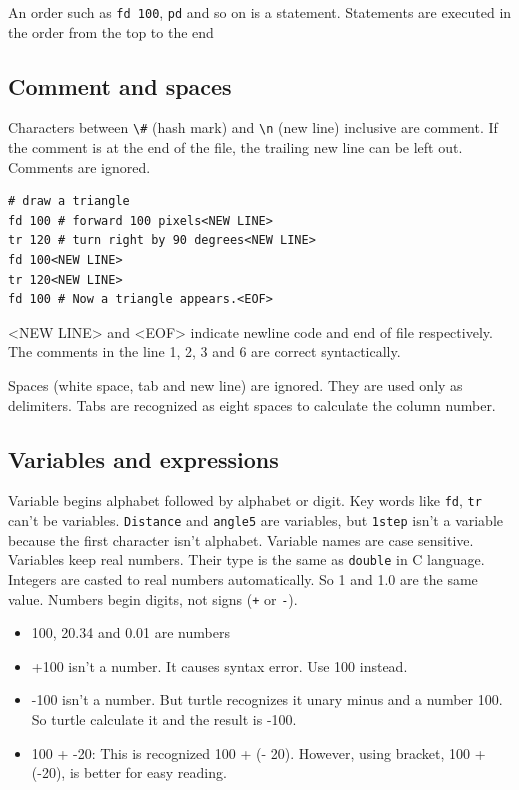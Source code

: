 An order such as \passthrough{\lstinline!fd 100!},
\passthrough{\lstinline!pd!} and so on is a statement. Statements are
executed in the order from the top to the end

\hypertarget{comment-and-spaces}{%
\subsection{Comment and spaces}\label{comment-and-spaces}}

Characters between \passthrough{\lstinline!\#!} (hash mark) and
\passthrough{\lstinline!\\n!} (new line) inclusive are comment. If the
comment is at the end of the file, the trailing new line can be left
out. Comments are ignored.

\begin{lstlisting}
# draw a triangle
fd 100 # forward 100 pixels<NEW LINE>
tr 120 # turn right by 90 degrees<NEW LINE>
fd 100<NEW LINE>
tr 120<NEW LINE>
fd 100 # Now a triangle appears.<EOF>
\end{lstlisting}

\textless NEW LINE\textgreater{} and \textless EOF\textgreater{}
indicate newline code and end of file respectively. The comments in the
line 1, 2, 3 and 6 are correct syntactically.

Spaces (white space, tab and new line) are ignored. They are used only
as delimiters. Tabs are recognized as eight spaces to calculate the
column number.

\hypertarget{variables-and-expressions}{%
\subsection{Variables and expressions}\label{variables-and-expressions}}

Variable begins alphabet followed by alphabet or digit. Key words like
\passthrough{\lstinline!fd!}, \passthrough{\lstinline!tr!} can't be
variables. \passthrough{\lstinline!Distance!} and
\passthrough{\lstinline!angle5!} are variables, but
\passthrough{\lstinline!1step!} isn't a variable because the first
character isn't alphabet. Variable names are case sensitive. Variables
keep real numbers. Their type is the same as
\passthrough{\lstinline!double!} in C language. Integers are casted to
real numbers automatically. So 1 and 1.0 are the same value. Numbers
begin digits, not signs (\passthrough{\lstinline!+!} or
\passthrough{\lstinline!-!}).

\begin{itemize}
\tightlist
\item
  100, 20.34 and 0.01 are numbers
\item
  +100 isn't a number. It causes syntax error. Use 100 instead.
\item
  -100 isn't a number. But turtle recognizes it unary minus and a number
  100. So turtle calculate it and the result is -100.
\item
  100 + -20: This is recognized 100 + (- 20). However, using bracket,
  100 + (-20), is better for easy reading.
\end{itemize}

